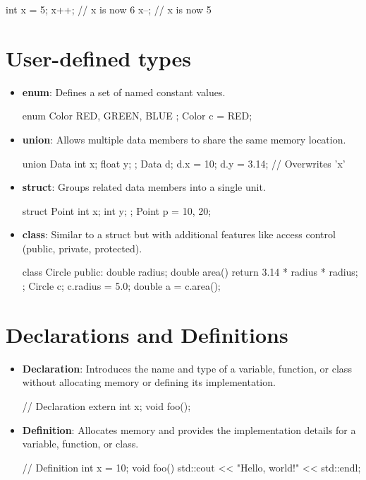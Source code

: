 \begin{codeblock}[language=C++]
int x = 5;
x++; // x is now 6
x--; // x is now 5
\end{codeblock}

\section{User-defined types}

\begin{itemize}
    \item \textbf{enum}: Defines a set of named constant values.
    \begin{codeblock}[language=C++]
enum Color { RED, GREEN, BLUE };
Color c = RED;
    \end{codeblock}
    \item \textbf{union}: Allows multiple data members to share the same memory location.
    \begin{codeblock}[language=C++]
union Data {
    int x;
    float y;
};
Data d;
d.x = 10;
d.y = 3.14; // Overwrites 'x'
    \end{codeblock}
    \item \textbf{struct}: Groups related data members into a single unit.
    \begin{codeblock}[language=C++]
struct Point {
    int x;
    int y;
};
Point p = {10, 20};
    \end{codeblock}
    \item \textbf{class}: Similar to a struct but with additional features like access control (public, private, protected).
    \begin{codeblock}[language=C++]
class Circle {
public:
    double radius;
    double area() {
        return 3.14 * radius * radius;
    }
};
Circle c;
c.radius = 5.0;
double a = c.area();
    \end{codeblock}
\end{itemize}



\section{Declarations and Definitions}

\begin{itemize}
    \item \textbf{Declaration}: Introduces the name and type of a variable, function, or class without allocating memory or defining its implementation.
\begin{codeblock}[language=C++, numbers=none]
// Declaration
extern int x;
void foo();
\end{codeblock}
    \item \textbf{Definition}: Allocates memory and provides the implementation details for a variable, function, or class.
\begin{codeblock}[language=C++, numbers=none]
// Definition
int x = 10;
void foo() {
    std::cout << "Hello, world!" << std::endl;
}
\end{codeblock}
\end{itemize}


